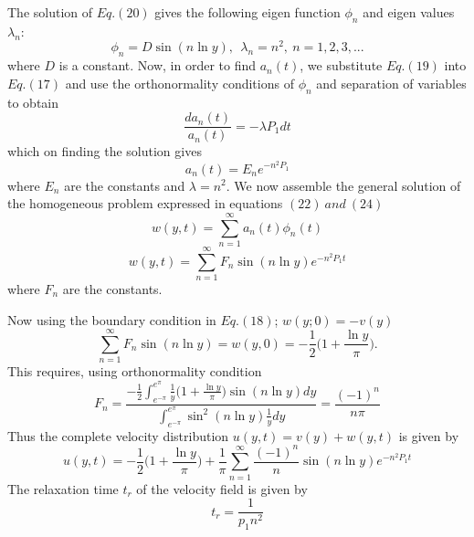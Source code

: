 \documentclass[10pt]{beamer}
\begin{document}
		\begin{frame}
		The solution of $ Eq. (20) $ gives the following eigen function $ \phi_n $ and eigen values $ \lambda_n $:
		\begin{equation}
		\phi_n = D \sin(n \ln y), ~~ \lambda_n = n^2, ~ n=1,2,3,...
		\end{equation}
		where $ D $ is a constant.
		Now, in order to find $ a_n(t) $, we substitute $ Eq. (19) $ into $ Eq. (17) $ and use the orthonormality conditions of $ \phi_n $ and separation of variables to obtain
		\begin{equation}
		\frac{d a_n(t)}{a_n(t)} = - \lambda P_1 dt
		\end{equation}
		which on finding the solution gives
		\begin{equation}
		a_n(t) = E_n e^{- n^2 P_1}
		\end{equation}
		where $ E_n $ are the constants and $ \lambda = n^2 $.
		We now assemble the general solution of the homogeneous problem expressed in equations $ (22) ~ and ~ (24) $
		$$ w(y,t) = \sum_{n=1}^{\infty} a_n(t)\phi_n(t) $$
		\begin{equation}
		w(y,t) = \sum_{n= 1}^{\infty} F_n \sin(n \ln y) e^{- n^2 P_1 t}
		\end{equation}
		where $ F_n $ are the constants.
		
		\end{frame}
		
		\begin{frame}
		Now using the boundary condition in $ Eq. (18) $; $ w(y; 0) = -v(y) $
		\begin{equation}
		\sum_{n= 1}^{\infty} F_n \sin(n \ln y) = w(y,0) = - \frac{1}{2} \bigg( 1 + \frac{\ln{y}}{\pi} \bigg).
		\end{equation}
		This requires, using orthonormality condition
		\begin{equation}
		F_n = \frac{-\frac{1}{2} \int_{e^{-\pi}}^{e^\pi} \frac{1}{y} \bigg( 1 + \frac{\ln{y}}{\pi} \bigg) \sin(n \ln y) dy   }{\int_{e^{-\pi} }^{e^\pi}  \sin^2 (n \ln y) \frac{1}{y} dy } = \frac{(-1)^n}{n\pi}
		\end{equation}
		Thus the complete velocity distribution $ u(y,t) = v(y) + w(y,t) $ is given by
		\begin{equation}
		u(y,t) = - \frac{1}{2} \bigg( 1 + \frac{\ln{y}}{\pi} \bigg) + \frac{1}{\pi} \sum_{n= 1}^{\infty} \frac{(-1)^n}{n} \sin(n \ln y) e^{- n^2 P_1 t}
		\end{equation}
		The relaxation time $ t_r $ of the velocity field is given by
		$$ t_r = \frac{1}{p_1 n^2} $$
		
		
		
		\end{frame}
				
\end{document}

